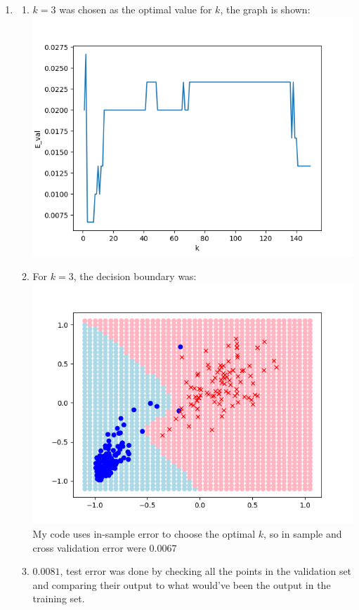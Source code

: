 \documentclass{article}
\begin{document}
    \begin{enumerate}
        \item \begin{enumerate}[label=(\alph*)]
            \item $k = 3$ was chosen as the optimal value for $k$, the graph is shown:\\\includegraphics[scale=0.5]{images/1_a.png}
            \item For $k=3$, the decision boundary was:\\\includegraphics[scale=0.5]{images/1_b.png}\\My code uses in-sample error to choose the optimal $k$, so in sample and cross validation error were $0.0067$
            \item $0.0081$, test error was done by checking all the points in the validation set and comparing their output to what would've been the output in the training set.
        \end{enumerate}


\end{enumerate}
\end{document}
